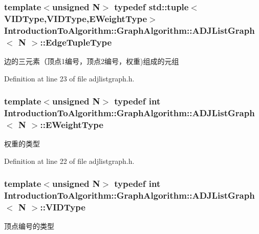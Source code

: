 \subsubsection[{Edge\+Tuple\+Type}]{\setlength{\rightskip}{0pt plus 5cm}template$<$unsigned N$>$ typedef std\+::tuple$<${\bf V\+I\+D\+Type},{\bf V\+I\+D\+Type},{\bf E\+Weight\+Type}$>$ {\bf Introduction\+To\+Algorithm\+::\+Graph\+Algorithm\+::\+A\+D\+J\+List\+Graph}$<$ N $>$\+::{\bf Edge\+Tuple\+Type}}\label{struct_introduction_to_algorithm_1_1_graph_algorithm_1_1_a_d_j_list_graph_a6757574602df8359b10e37079c789eb6}
边的三元素（顶点1编号，顶点2编号，权重)组成的元组 

Definition at line 23 of file adjlistgraph.\+h.

\hypertarget{struct_introduction_to_algorithm_1_1_graph_algorithm_1_1_a_d_j_list_graph_a8b9518587536b482cfd8c2fc7f5c9678}{}
\subsubsection[{E\+Weight\+Type}]{\setlength{\rightskip}{0pt plus 5cm}template$<$unsigned N$>$ typedef int {\bf Introduction\+To\+Algorithm\+::\+Graph\+Algorithm\+::\+A\+D\+J\+List\+Graph}$<$ N $>$\+::{\bf E\+Weight\+Type}}\label{struct_introduction_to_algorithm_1_1_graph_algorithm_1_1_a_d_j_list_graph_a8b9518587536b482cfd8c2fc7f5c9678}
权重的类型 

Definition at line 22 of file adjlistgraph.\+h.

\hypertarget{struct_introduction_to_algorithm_1_1_graph_algorithm_1_1_a_d_j_list_graph_aa42303d15a6a0e4cf6fad5c1327c1d79}{}
\subsubsection[{V\+I\+D\+Type}]{\setlength{\rightskip}{0pt plus 5cm}template$<$unsigned N$>$ typedef int {\bf Introduction\+To\+Algorithm\+::\+Graph\+Algorithm\+::\+A\+D\+J\+List\+Graph}$<$ N $>$\+::{\bf V\+I\+D\+Type}}\label{struct_introduction_to_algorithm_1_1_graph_algorithm_1_1_a_d_j_list_graph_aa42303d15a6a0e4cf6fad5c1327c1d79}
顶点编号的类型 

